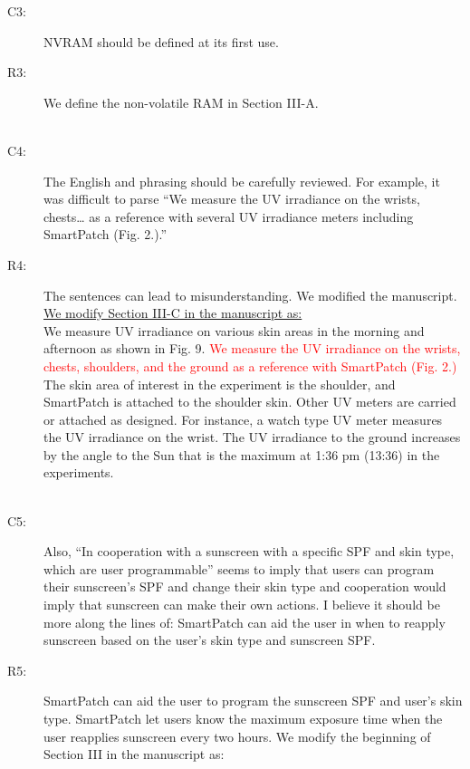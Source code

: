 \documentclass[onecolumn]{IEEEconf}
\begin{document}
\begin{description}
\item [C3: ] NVRAM should be defined at its first use.
\item [R3: ] We define the non-volatile RAM in Section III-A.\\
~\\

\item [C4:] The English and phrasing should be carefully reviewed. For example, it was difficult to parse “We measure the UV irradiance on the wrists, chests… as a reference with several UV irradiance meters including SmartPatch (Fig. 2.).” 

\item [R4: ] The sentences can lead to misunderstanding. We modified the manuscript. \\

\underline{We modify Section III-C in the manuscript as:}\\
We measure UV irradiance on various skin areas in the morning and afternoon as shown in Fig. 9. \textcolor{red}{We measure the UV irradiance on the wrists, chests, shoulders, and the ground as a reference with SmartPatch (Fig. 2.)} The skin area of interest in the experiment is the shoulder, and SmartPatch is attached to the shoulder skin. Other UV meters are carried or attached as designed. For instance, a watch type UV meter measures the UV irradiance on the wrist. The UV irradiance to the ground increases by the angle to the Sun that is the maximum at 1:36 pm (13:36) in the experiments.\\
~\\

\item [C5:] Also, ``In cooperation with a sunscreen with a specific SPF and skin type, which are user programmable'' seems to imply that users can program their sunscreen's SPF and change their skin type and cooperation would imply that sunscreen can make their own actions. I believe it should be more along the lines of: SmartPatch can aid the user in when to reapply sunscreen based on the user's skin type and sunscreen SPF.

\item [R5: ] SmartPatch can aid the user to program the sunscreen SPF and user's skin type. SmartPatch let users know the maximum exposure time when the user reapplies sunscreen every two hours. We modify the beginning of Section III in the manuscript as:


\end{description}
\end{document}
